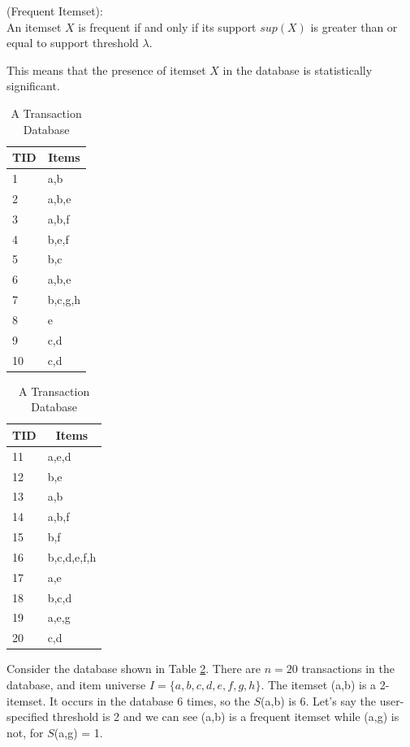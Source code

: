 \documentclass[conference]{IEEEtran}
\begin{document}
\begin{definition}{(Frequent Itemset):}\\
An itemset $X$ is frequent if and only if its support $sup(X)$ is greater than or equal to support threshold $\lambda$.
\end{definition}
This means that the presence of itemset $X$ in the database is statistically significant.



\begin{table}[htbp]
    \caption{A Transaction Database}\label{db}
    \centering
    \begin{tabular}{|l|l|}
    \hline
    TID & \multicolumn{1}{c|}{Items} \\ \hline
    1   & a,b   \\ \hline
    2   & a,b,e \\ \hline
    3   & a,b,f \\ \hline
    4   & b,e,f \\ \hline
    5   & b,c   \\ \hline
    6   & a,b,e \\ \hline
    7   & b,c,g,h \\ \hline
    8   & e     \\ \hline
    9   & c,d   \\ \hline
    10  & c,d   \\ \hline
    \end{tabular}
    \begin{tabular}{|l|l|}
    \hline
    TID & \multicolumn{1}{c|}{Items} \\ \hline
    11  & a,e,d          \\ \hline
    12  & b,e        \\ \hline
    13  & a,b         \\ \hline
    14  & a,b,f        \\ \hline
    15  & b,f      \\ \hline
    16  & b,c,d,e,f,h  \\ \hline
    17  & a,e        \\ \hline
    18  & b,c,d          \\ \hline
    19  & a,e,g         \\ \hline
    20  & c,d        \\ \hline
    \end{tabular}
\end{table}

\begin{example}\label{ex1}
Consider the database shown in Table \ref{db}. There are $n=20$ transactions in the database, and item universe $I=\{a,b,c,d,e,f,g,h\}$.
The itemset (a,b) is a 2-itemset. It occurs in the database 6 times, so the $S$(a,b) is 6. 
Let's say the user-specified threshold is 2 and we can see (a,b) is a frequent itemset while (a,g) is not, for $S$(a,g) = 1.
\end{example}
\end{document}
